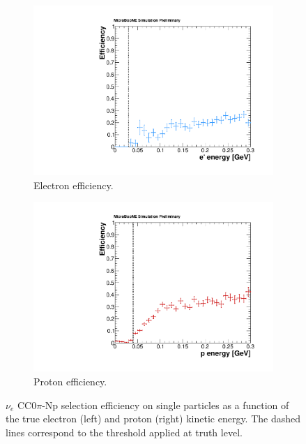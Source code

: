 \begin{figure}
\centering
  \begin{subfigure}{0.48\textwidth}
    \includegraphics[width=\linewidth]{figures/e_efficiency.pdf}
    \caption{Electron efficiency.} 
  \end{subfigure}
    \begin{subfigure}{0.48\textwidth}
    \includegraphics[width=\linewidth]{figures/p_efficiency.pdf}
    \caption{Proton efficiency.} 
  \end{subfigure}
  \caption{$\nu_{e}$ CC$0\pi$-Np selection efficiency on single particles as a function of the true electron (left) and proton (right) kinetic energy. The dashed lines correspond to the threshold applied at truth level.}
  \label{fig:thresholds}
\end{figure}


